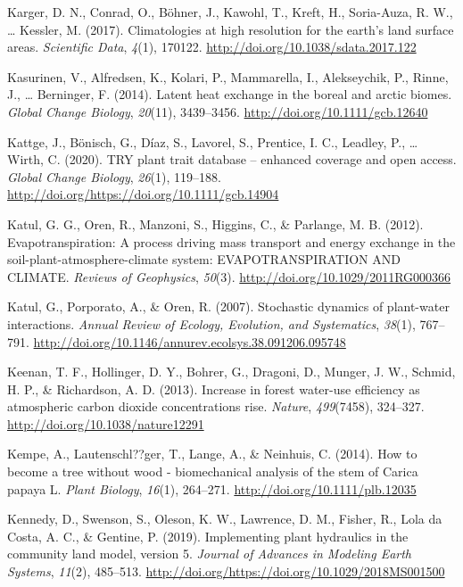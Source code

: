 \documentclass[11pt,twoside]{reedthesis}
\begin{document}
\hypertarget{ref-karger_climatologies_2017}{}
Karger, D. N., Conrad, O., Böhner, J., Kawohl, T., Kreft, H.,
Soria-Auza, R. W., \ldots{} Kessler, M. (2017). Climatologies at high
resolution for the earth's land surface areas. \emph{Scientific Data},
\emph{4}(1), 170122. \url{http://doi.org/10.1038/sdata.2017.122}

\hypertarget{ref-kasurinen_latent_2014}{}
Kasurinen, V., Alfredsen, K., Kolari, P., Mammarella, I., Alekseychik,
P., Rinne, J., \ldots{} Berninger, F. (2014). Latent heat exchange in
the boreal and arctic biomes. \emph{Global Change Biology},
\emph{20}(11), 3439--3456. \url{http://doi.org/10.1111/gcb.12640}

\hypertarget{ref-Kattge2020}{}
Kattge, J., Bönisch, G., Díaz, S., Lavorel, S., Prentice, I. C.,
Leadley, P., \ldots{} Wirth, C. (2020). TRY plant trait database --
enhanced coverage and open access. \emph{Global Change Biology},
\emph{26}(1), 119--188.
\url{http://doi.org/https://doi.org/10.1111/gcb.14904}

\hypertarget{ref-katul_evapotranspiration_2012}{}
Katul, G. G., Oren, R., Manzoni, S., Higgins, C., \& Parlange, M. B.
(2012). Evapotranspiration: A process driving mass transport and energy
exchange in the soil-plant-atmosphere-climate system: EVAPOTRANSPIRATION
AND CLIMATE. \emph{Reviews of Geophysics}, \emph{50}(3).
\url{http://doi.org/10.1029/2011RG000366}

\hypertarget{ref-Katul2007}{}
Katul, G., Porporato, A., \& Oren, R. (2007). Stochastic dynamics of
plant-water interactions. \emph{Annual Review of Ecology, Evolution, and
Systematics}, \emph{38}(1), 767--791.
\url{http://doi.org/10.1146/annurev.ecolsys.38.091206.095748}

\hypertarget{ref-Keenan2013}{}
Keenan, T. F., Hollinger, D. Y., Bohrer, G., Dragoni, D., Munger, J. W.,
Schmid, H. P., \& Richardson, A. D. (2013). Increase in forest water-use
efficiency as atmospheric carbon dioxide concentrations rise.
\emph{Nature}, \emph{499}(7458), 324--327.
\url{http://doi.org/10.1038/nature12291}

\hypertarget{ref-Kempe2014}{}
Kempe, A., Lautenschl??ger, T., Lange, A., \& Neinhuis, C. (2014). How
to become a tree without wood - biomechanical analysis of the stem of
Carica papaya L. \emph{Plant Biology}, \emph{16}(1), 264--271.
\url{http://doi.org/10.1111/plb.12035}

\hypertarget{ref-Kennedy2019}{}
Kennedy, D., Swenson, S., Oleson, K. W., Lawrence, D. M., Fisher, R.,
Lola da Costa, A. C., \& Gentine, P. (2019). Implementing plant
hydraulics in the community land model, version 5. \emph{Journal of
Advances in Modeling Earth Systems}, \emph{11}(2), 485--513.
\url{http://doi.org/https://doi.org/10.1029/2018MS001500}
\end{document}
